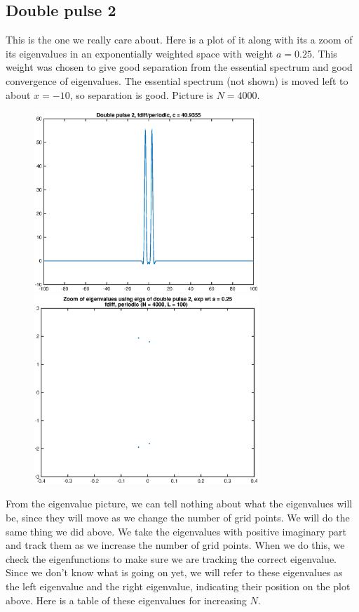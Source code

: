 \documentclass[12pt]{article}
\begin{document}
\subsection*{Double pulse 2}
This is the one we really care about. Here is a plot of it along with its a zoom of its eigenvalues in an exponentially weighted space with weight $a = 0.25$. This weight was chosen to give good separation from the essential spectrum and good convergence of eigenvalues. The essential spectrum (not shown) is moved left to about $x = -10$, so separation is good. Picture is $N = 4000$.
\begin{figure}[H]
\includegraphics[width=8.5cm]{double2.eps}
\includegraphics[width=8.5cm]{double2eigszoom.eps}
\end{figure}
From the eigenvalue picture, we can tell nothing about what the eigenvalues will be, since they will move as we change the number of grid points. We will do the same thing we did above. We take the eigenvalues with positive imaginary part and track them as we increase the number of grid points. When we do this, we check the eigenfunctions to make sure we are tracking the correct eigenvalue. Since we don't know what is going on yet, we will refer to these eigenvalues as the left eigenvalue and the right eigenvalue, indicating their position on the plot above. Here is a table of these eigenvalues for increasing $N$.
\end{document}
